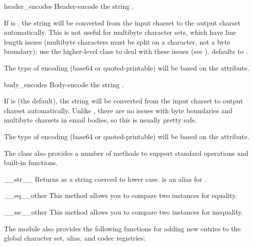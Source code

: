 \begin{methoddesc}{header_encode}{s}
Header-encode the string .

If  is , the string will be converted from the
input charset to the output charset automatically.  This is not useful
for multibyte character sets, which have line length issues (multibyte
characters must be split on a character, not a byte boundary); use the
higher-level  class to deal with these issues (see
).   defaults to .

The type of encoding (base64 or quoted-printable) will be based on
the  attribute.
\end{methoddesc}

\begin{methoddesc}{body_encode}{s}
Body-encode the string .

If  is  (the default), the string will be
converted from the input charset to output charset automatically.
Unlike , there are no issues with byte
boundaries and multibyte charsets in email bodies, so this is usually
pretty safe.

The type of encoding (base64 or quoted-printable) will be based on
the  attribute.
\end{methoddesc}

The  class also provides a number of methods to support
standard operations and built-in functions.

\begin{methoddesc}[Charset]{__str__}{}
Returns  as a string coerced to lower case.
 is an alias for .
\end{methoddesc}

\begin{methoddesc}[Charset]{__eq__}{other}
This method allows you to compare two  instances for equality.
\end{methoddesc}

\begin{methoddesc}[Header]{__ne__}{other}
This method allows you to compare two  instances for inequality.
\end{methoddesc}

The  module also provides the following
functions for adding new entries to the global character set, alias,
and codec registries:


